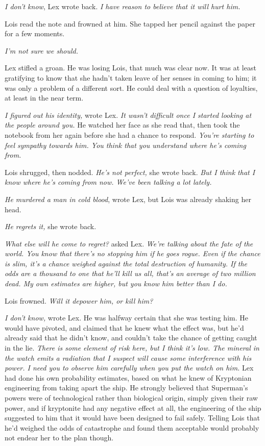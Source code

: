 \documentclass[ebook,12pt]{memoir}
\begin{document}
\emph{I don't know}, Lex wrote back. \emph{I have reason to believe that
it will hurt him.}

Lois read the note and frowned at him. She tapped her pencil against the
paper for a few moments.

\emph{I'm not sure we should.}

Lex stifled a groan. He was losing Lois, that much was clear now. It was
at least gratifying to know that she hadn't taken leave of her senses in
coming to him; it was only a problem of a different sort. He could deal
with a question of loyalties, at least in the near term.

\emph{I figured out his identity,} wrote Lex. \emph{It wasn't difficult
once I started looking at the people around you.} He watched her face as
she read that, then took the notebook from her again before she had a
chance to respond. \emph{You're starting to feel sympathy towards him.
You think that you understand where he's coming from.}

Lois shrugged, then nodded. \emph{He's not perfect,} she wrote back.
\emph{But I think that I know where he's coming from now. We've been
talking a lot lately.}

\emph{He murdered a man in cold blood}, wrote Lex, but Lois was already
shaking her head.

\emph{He regrets it,} she wrote back.

\emph{What else will he come to regret?} asked Lex. \emph{We're talking
about the fate of the world. You know that there's no stopping him if he
goes rogue. Even if the chance is slim, it's a chance weighed against
the total destruction of humanity. If the odds are a thousand to one
that he'll kill us all, that's an average of two million dead. My own
estimates are higher, but you know him better than I do.}

Lois frowned. \emph{Will it depower him, or kill him?}

\emph{I don't know,} wrote Lex. He was halfway certain that she was
testing him. He would have pivoted, and claimed that he knew what the
effect was, but he'd already said that he didn't know, and couldn't take
the chance of getting caught in the lie. \emph{There is some element of
risk here, but I think it's low. The mineral in the watch emits a
radiation that I suspect will cause some interference with his power. I
need you to observe him carefully when you put the watch on him.} Lex
had done his own probability estimates, based on what he knew of
Kryptonian engineering from taking apart the ship. He strongly believed
that Superman's powers were of technological rather than biological
origin, simply given their raw power, and if kryptonite had any negative
effect at all, the engineering of the ship suggested to him that it
would have been designed to fail safely. Telling Lois that he'd weighed
the odds of catastrophe and found them acceptable would probably not
endear her to the plan though.
\end{document}
